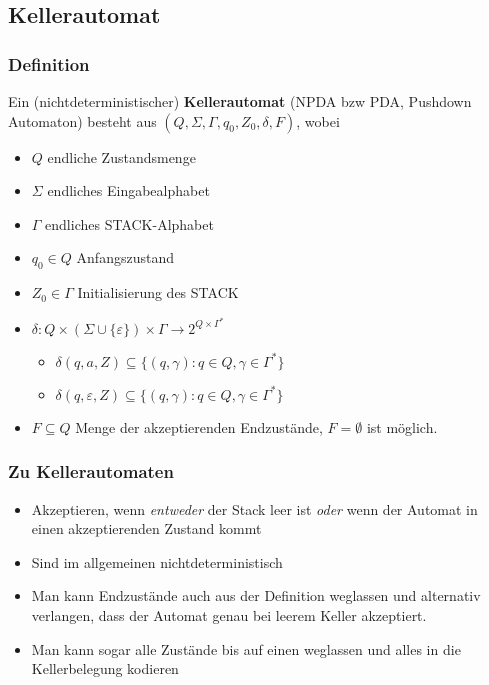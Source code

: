 \subsection{Kellerautomat}
\begin{frame}
\frametitle{Definition}
Ein (nichtdeterministischer) \textbf{Kellerautomat} (NPDA bzw PDA, Pushdown Automaton) besteht aus $(Q, \Sigma, \Gamma, q_0, Z_0,\delta, F)$, wobei
\begin{itemize}
\item $Q$ endliche Zustandsmenge
\item $\Sigma$ endliches Eingabealphabet
\item $\Gamma$ endliches STACK-Alphabet
\item $q_0 \in Q$ Anfangszustand
\item $Z_0 \in \Gamma$ Initialisierung des STACK
\item $\delta : Q \times ( \Sigma \cup \{\varepsilon\}) \times \Gamma \rightarrow 2^{Q \times \Gamma^*}$
\begin{itemize}
\item $\delta(q, a, Z) \subseteq \{(q,\gamma) : q \in Q, \gamma \in \Gamma^*\}$
\item $\delta(q, \varepsilon, Z) \subseteq \{(q,\gamma) : q \in Q, \gamma \in \Gamma^*\}$
\end{itemize}
\item $F \subseteq Q$ Menge der akzeptierenden Endzustände, $F=\emptyset$ ist möglich.
\end{itemize}
\end{frame}

\begin{frame}
\frametitle{Zu Kellerautomaten}
\begin{itemize}
\item Akzeptieren, wenn \emph{entweder} der Stack leer ist \emph{oder} wenn der Automat in einen akzeptierenden Zustand kommt
\item Sind im allgemeinen nichtdeterministisch
\item Man kann Endzustände auch aus der Definition weglassen und alternativ verlangen, dass der Automat genau bei leerem Keller akzeptiert.
\item Man kann sogar alle Zustände bis auf einen weglassen und alles in die Kellerbelegung kodieren
\end{itemize}
\end{frame}

